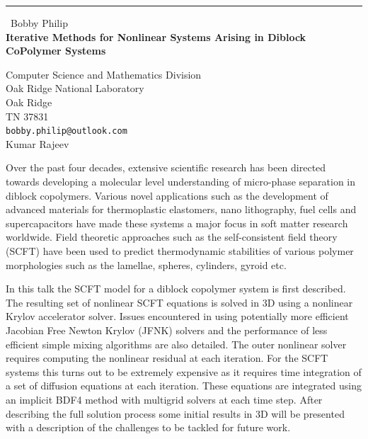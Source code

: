 \documentclass{report}
\begin{document}
\begin{center}
\rule{6in}{1pt} \
{\large Bobby Philip \\
{\bf Iterative Methods for Nonlinear Systems Arising in Diblock CoPolymer Systems}}

Computer Science and Mathematics Division \\ Oak Ridge National Laboratory \\ Oak Ridge \\ TN 37831
\\
{\tt bobby.philip@outlook.com}\\
Kumar Rajeev\end{center}

Over the past four decades, extensive scientific research has been
directed towards developing a molecular level understanding of
micro-phase separation in diblock copolymers. Various novel applications
such as the development of advanced materials for thermoplastic
elastomers, nano lithography, fuel cells and supercapacitors have made
these systems a major focus in soft matter research worldwide. Field
theoretic approaches such as the self-consistent field theory (SCFT) have
been used to predict thermodynamic stabilities of various polymer
morphologies such as the lamellae, spheres, cylinders, gyroid etc.

In this talk the SCFT model for a diblock copolymer system is first
described. The resulting set of nonlinear SCFT equations is solved in 3D
using a nonlinear Krylov accelerator solver. Issues encountered in using
potentially more efficient Jacobian Free Newton Krylov (JFNK) solvers and
the performance of less efficient simple mixing algorithms are also
detailed. The outer nonlinear solver requires computing the nonlinear
residual at each iteration. For the SCFT systems this turns out to be
extremely expensive as it requires time integration of a set of diffusion
equations at each iteration. These equations are integrated using an
implicit BDF4 method with multigrid solvers at each time step. After
describing the full solution process some initial results in 3D will be
presented with a description of the challenges to be tackled for future
work.
\end{document}
